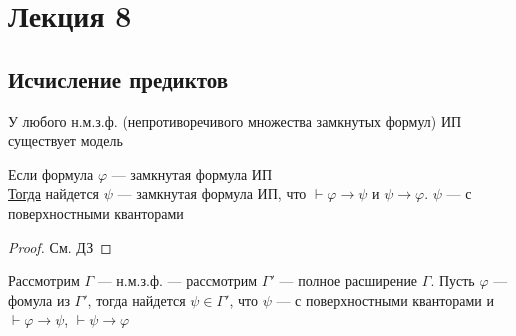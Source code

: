 \documentclass[oneside]{book}
\renewcommand{\leftmark}{}
\begin{document}
\chapter*{Лекция 8}\renewcommand{\leftmark}{Лекция 8}
\label{sec:org3e7bdb1}
\section{Исчисление предиктов}
\label{sec:org22293b2}
\begin{theorem}
	У любого н.м.з.ф. (непротиворечивого множества замкнутых формул) ИП существует модель
	\label{org8a87687}
\end{theorem}
\begin{theorem}
	Если формула \(\varphi\) --- замкнутая формула ИП \\
	\uline{Тогда} найдется \(\psi\) --- замкнутая формула ИП, что \(\vdash \varphi \to \psi\) и \(\psi \to \varphi\). \(\psi\) --- с поверхностными кванторами
\end{theorem}
\begin{proof}
	См. ДЗ
\end{proof}
\begin{remark}
	Рассмотрим \(\Gamma\) --- н.м.з.ф. --- рассмотрим \(\Gamma'\) --- полное расширение \(\Gamma\). Пусть \(\varphi\) --- фомула из \(\Gamma'\), тогда найдется \(\psi \in \Gamma'\), что \(\psi\) --- с поверхностными кванторами и \(\vdash \varphi \to \psi\), \(\vdash \psi \to \varphi\)
\end{remark}
\end{document}
